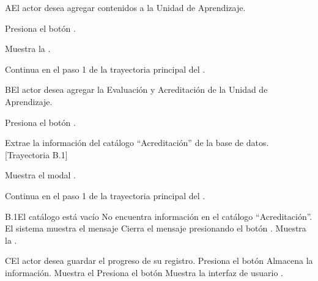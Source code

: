 \begin{UCtrayectoriaA}{A}{El actor desea agregar contenidos a la Unidad de Aprendizaje.}

\UCpaso[\UCactor] Presiona el botón .

\UCpaso Muestra la .

\UCpaso Continua en el paso 1 de la trayectoria principal del .
\end{UCtrayectoriaA}

\begin{UCtrayectoriaA}{B}{El actor desea agregar la Evaluación y Acreditación de la Unidad de Aprendizaje.}

\UCpaso[\UCactor] Presiona el botón .

\UCpaso Extrae la información del catálogo ``Acreditación'' de la base de datos. [Trayectoria B.1]

\UCpaso Muestra el modal .

\UCpaso Continua en el paso 1 de la trayectoria principal del .
\end{UCtrayectoriaA}

\begin{UCtrayectoriaA}{B.1}{El catálogo está vacío}
    \UCpaso No encuentra información en el catálogo ``Acreditación''.
    \UCpaso El sistema muestra el mensaje 
    \UCpaso[\UCactor] Cierra el mensaje presionando el botón .
    \UCpaso Muestra la .
\end{UCtrayectoriaA}

\begin{UCtrayectoriaA}{C}{El actor desea guardar el progreso de su registro.}
\UCpaso[\UCactor] Presiona el botón 
\UCpaso Almacena la información.
\UCpaso Muestra el 
\UCpaso[\UCactor] Presiona el botón  
\UCpaso Muestra la interfaz de usuario .
\end{UCtrayectoriaA}

